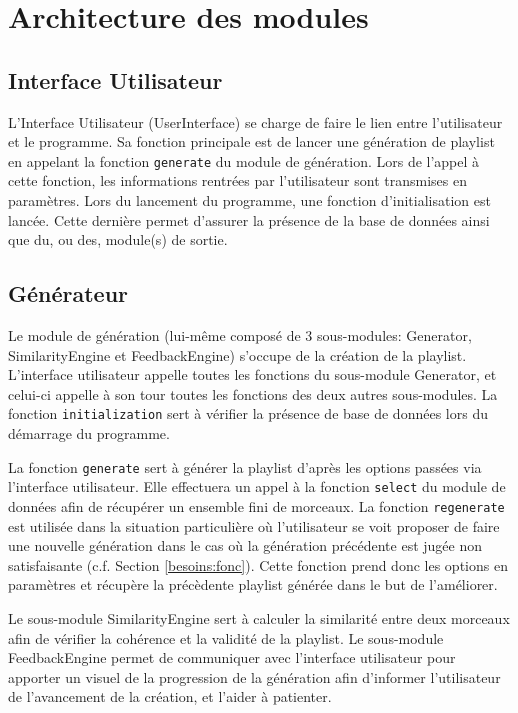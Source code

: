 
\section{Architecture des modules}
\label{archi:modules}

\subsection{Interface Utilisateur}
\label{archi:modules:iu}

L'Interface Utilisateur (UserInterface) se charge de faire le lien entre
l'utilisateur et le programme. Sa fonction principale est de lancer une
génération de playlist en appelant la fonction \texttt{generate} du module de 
génération. Lors de l'appel à cette fonction, les informations rentrées par 
l'utilisateur sont transmises en paramètres. Lors du lancement du programme,
 une fonction d'initialisation est lancée. Cette dernière permet d'assurer 
 la présence de la base de données ainsi que du, ou des, module(s) de sortie.

\subsection{Générateur}
\label{archi:modules:generateur}

Le module de génération (lui-même composé de 3 sous-modules: Generator, 
SimilarityEngine et FeedbackEngine) s'occupe de la création de la playlist. 
L'interface utilisateur appelle toutes les fonctions du sous-module 
Generator, et celui-ci appelle à son tour toutes les fonctions des deux 
autres sous-modules. La fonction \texttt{initialization} sert à vérifier la 
présence de base de données lors du démarrage du programme. 

La fonction \texttt{generate} sert à générer la playlist d'après les options 
passées via l'interface utilisateur. Elle effectuera un appel à la fonction 
\texttt{select} du module de données afin de récupérer un ensemble fini de morceaux.
 La fonction \texttt{regenerate} est utilisée dans la situation particulière où 
 l'utilisateur se voit proposer de faire une nouvelle génération dans le cas 
 où la génération précédente est jugée non satisfaisante (c.f. Section
  \ref{besoins:fonc}). Cette fonction prend donc les options en paramètres 
 et récupère la précèdente playlist générée dans le but de l'améliorer.

Le sous-module SimilarityEngine sert à calculer la similarité entre deux 
morceaux afin de vérifier la cohérence et la validité de la playlist. Le 
sous-module FeedbackEngine permet de communiquer avec l'interface 
utilisateur pour apporter un visuel de la progression de la génération afin 
d'informer l'utilisateur de l'avancement de la création, et l'aider à 
patienter.

